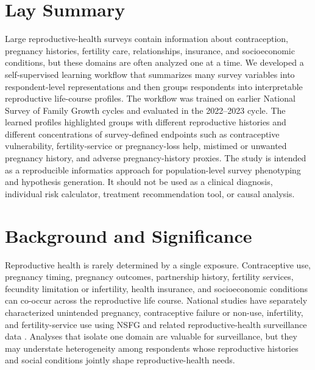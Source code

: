 \documentclass[referee,pdflatex,sn-basic,Numbered]{sn-jnl}
\begin{document}

\maketitle

\section*{Lay Summary}

Large reproductive-health surveys contain information about contraception, pregnancy histories, fertility care, relationships, insurance, and socioeconomic conditions, but these domains are often analyzed one at a time. We developed a self-supervised learning workflow that summarizes many survey variables into respondent-level representations and then groups respondents into interpretable reproductive life-course profiles. The workflow was trained on earlier National Survey of Family Growth cycles and evaluated in the 2022--2023 cycle. The learned profiles highlighted groups with different reproductive histories and different concentrations of survey-defined endpoints such as contraceptive vulnerability, fertility-service or pregnancy-loss help, mistimed or unwanted pregnancy history, and adverse pregnancy-history proxies. The study is intended as a reproducible informatics approach for population-level survey phenotyping and hypothesis generation. It should not be used as a clinical diagnosis, individual risk calculator, treatment recommendation tool, or causal analysis.

\section{Background and Significance}

Reproductive health is rarely determined by a single exposure. Contraceptive use, pregnancy timing, pregnancy outcomes, partnership history, fertility services, fecundity limitation or infertility, health insurance, and socioeconomic conditions can co-occur across the reproductive life course. National studies have separately characterized unintended pregnancy, contraceptive failure or non-use, infertility, and fertility-service use using NSFG and related reproductive-health surveillance data \cite{finer_zolna_unintended,contraceptive_failure,infertility_impaired,infertility_service,contraceptive_nonuse}. Analyses that isolate one domain are valuable for surveillance, but they may understate heterogeneity among respondents whose reproductive histories and social conditions jointly shape reproductive-health needs.
\end{document}

